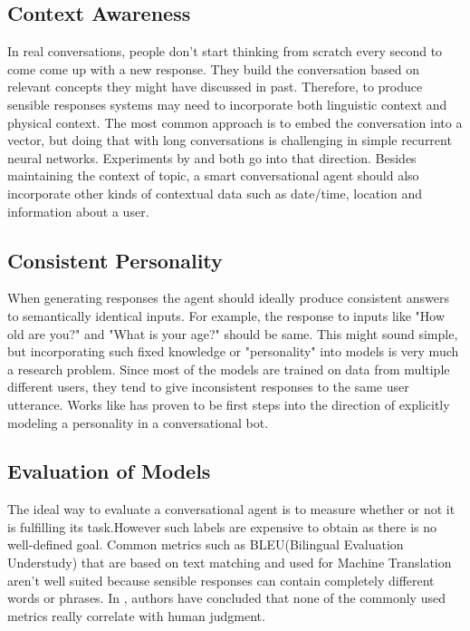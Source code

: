 \documentclass[letterpaper] {article} %
\begin{document}
\subsection{Context Awareness}
In real conversations, people don't start thinking from scratch every second to come come up with a new response. They build the conversation based on relevant concepts they might have discussed in past. Therefore, to produce sensible responses systems may need to incorporate both linguistic context and physical context. The most common approach is to embed the conversation into a vector, but doing that with long conversations is challenging in simple recurrent neural networks. Experiments by \cite{serban2016building} and \cite{yao2015attention} both go into that direction. Besides maintaining the context of topic, a smart conversational agent should also incorporate other kinds of contextual data such as date/time, location and information about a user.

\subsection{Consistent Personality}
When generating responses the agent should ideally produce consistent answers to semantically identical inputs. For example, the response to inputs like "How old are you?" and "What is your age?" should be same. This might sound simple, but incorporating such fixed knowledge or "personality" into models is very much a research problem. Since most of the models are trained on data from multiple different users, they tend to give inconsistent responses to the same user utterance. Works like \cite{li2016persona} has proven to be first steps into the direction of explicitly modeling a personality in a conversational bot.
\subsection{Evaluation of Models}
The ideal way to evaluate a conversational agent is to measure whether or not it is fulfilling its task.However such labels are expensive to obtain as there is no well-defined goal. Common metrics such as BLEU(Bilingual Evaluation Understudy) that are based on text matching and used for Machine Translation aren’t well suited because sensible responses can contain completely different words or phrases. In \cite{liu2016not}, authors have concluded that none of the commonly used metrics really correlate with human judgment.
\end{document}
